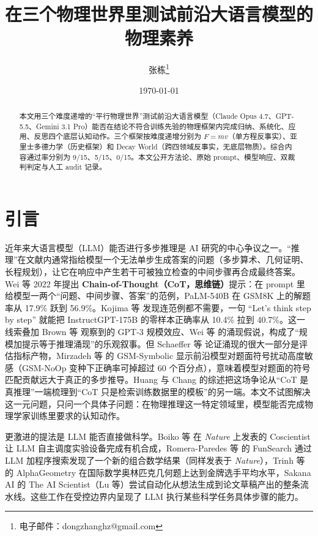 \documentclass[11pt]{article}
\title{在三个物理世界里测试前沿大语言模型的物理素养}
\author{张栋\thanks{电子邮件：dongzhanghz@gmail.com}}
\date{\today}
\begin{document}
\maketitle

\begin{abstract}
\noindent 本文用三个难度递增的“平行物理世界”测试前沿大语言模型（Claude Opus 4.7、GPT-5.5、Gemini 3.1 Pro）能否在结论不符合训练先验的物理框架内完成归纳、系统化、应用、反思四个底层认知动作。三个框架按难度递增分别为 $F=mv$（单方程反事实）、亚里士多德力学（历史框架）和 Decay World（跨四领域反事实，无底层物质）。综合内容通过率分别为 9/15、5/15、0/15。本文公开方法论、原始 prompt、模型响应、双裁判判定与人工 audit 记录。
\end{abstract}


\section{引言}\label{sec:intro}

近年来大语言模型（LLM）能否进行多步推理是 AI 研究的中心争议之一。“推理”在文献内通常指给模型一个无法单步生成答案的问题（多步算术、几何证明、长程规划），让它在响应中产生若干可被独立检查的中间步骤再合成最终答案。Wei 等\citep{wei2022chain} 2022 年提出 \textbf{Chain-of-Thought（CoT，思维链）}提示：在 prompt 里给模型一两个“问题、中间步骤、答案”的范例，PaLM-540B 在 GSM8K\citep{cobbe2021training} 上的解题率从 17.9\% 跃到 56.9\%。Kojima 等\citep{kojima2022zero} 发现连范例都不需要，一句 ``Let's think step by step'' 就能把 InstructGPT-175B 的零样本正确率从 10.4\% 拉到 40.7\%。这一线索叠加 Brown 等\citep{brown2020language} 观察到的 GPT-3 规模效应、Wei 等\citep{wei2022emergent} 的涌现假说，构成了“规模加提示等于推理涌现”的乐观叙事。但 Schaeffer 等\citep{schaeffer2023emergent} 论证涌现的很大一部分是评估指标产物，Mirzadeh 等\citep{mirzadeh2024gsm} 的 GSM-Symbolic 显示前沿模型对题面符号扰动高度敏感（GSM-NoOp 变种下正确率可掉超过 60 个百分点），意味着模型对题面的符号匹配贡献远大于真正的多步推导。Huang 与 Chang\citep{huang2023reasoning} 的综述把这场争论从“CoT 是真推理”一端梳理到“CoT 只是检索训练数据里的模板”的另一端。本文不试图解决这一元问题，只问一个具体子问题：在物理推理这一特定领域里，模型能否完成物理学家训练里要求的认知动作。

更激进的提法是 LLM 能否直接做科学。Boiko 等\citep{boiko2023autonomous} 在 \emph{Nature} 上发表的 Coscientist 让 LLM 自主调度实验设备完成有机合成，Romera-Paredes 等\citep{romera2024mathematical} 的 FunSearch 通过 LLM 加程序搜索发现了一个新的组合数学结果（同样发表于 \emph{Nature}），Trinh 等\citep{trinh2024solving} 的 AlphaGeometry 在国际数学奥林匹克几何题上达到金牌选手平均水平，Sakana AI 的 The AI Scientist（Lu 等\citep{lu2024ai}）尝试自动化从想法生成到论文草稿产出的整条流水线。这些工作在受控边界内呈现了 LLM 执行某些科学任务具体步骤的能力。
\end{document}
